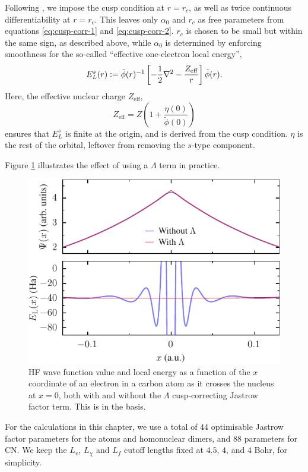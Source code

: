Following , we impose the cusp condition at $r=r_c$, as well as twice continuous differentiability at $r=r_c$. This leaves only $\alpha_0$ and $r_c$ as free parameters from equations \ref{eq:cusp-corr-1} and \ref{eq:cusp-corr-2}. $r_c$ is chosen to be small but within the same sign, as described above, while $\alpha_0$ is determined by enforcing smoothness for the so-called ``effective one-electron local energy'',
\begin{equation}
    E_L^s(r) \mathrel{\mathop:}= \tilde\phi(r)^{-1}\left[-\frac 12\nabla^2-\frac{Z_{\mathrm{eff}}}r\right]\tilde\phi(r).
\end{equation}
Here, the effective nuclear charge $Z_\mathrm{eff}$,
\begin{equation}
    Z_\mathrm{eff} = Z\left(1 + \frac{\eta(0)}{\tilde\phi(0)}\right)
\end{equation}
ensures that $E_L^s$ is finite at the origin, and is derived from the cusp condition. $\eta$ is the rest of the orbital, leftover from removing the $s$-type component.

Figure \ref{fig:cusp-term} illustrates the effect of using a $\Lambda$
term in practice.

\begin{figure}[htbp]
    \centering
    \includegraphics[width=0.8\columnwidth]{figures/optimisation/Fig/cusp-term-eps-converted-to}
    \caption{\gls{HF} wave function value and local energy as a function of the $x$ coordinate of an electron in a carbon atom as it crosses the nucleus at $x=0$, both with and without the $\Lambda$ cusp-correcting Jastrow factor term. This is in the \vdz basis.}
    \label{fig:cusp-term}
\end{figure}

For the calculations in this chapter, we use a total of $44$ optimisable Jastrow factor parameters for the atoms and homonuclear dimers, and $88$ parameters for CN. We keep the $L_v$, $L_\chi$ and $L_f$ cutoff lengths fixed at $4.5$, $4$, and $4$ Bohr, for simplicity.

